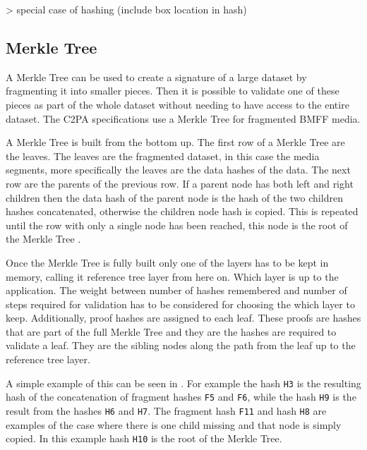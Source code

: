 
> special case of hashing (include box location in hash)



\subsection{Merkle Tree\label{sec:merkle}}

A Merkle Tree can be used to create a signature of a large dataset by fragmenting it into smaller pieces. Then it is possible to validate one of these pieces as part of the whole dataset without needing to have access to the entire dataset. The C2PA specifications use a Merkle Tree for fragmented BMFF media.

A Merkle Tree is built from the bottom up. The first row of a Merkle Tree are the leaves. The leaves are the fragmented dataset, in this case the media segments, more specifically the leaves are the data hashes of the data. The next row are the parents of the previous row. If a parent node has both left and right children then the data hash of the parent node is the hash of the two children hashes concatenated, otherwise the children node hash is copied. This is repeated until the row with only a single node has been reached, this node is the root of the Merkle Tree \cite{merkle}.

Once the Merkle Tree is fully built only one of the layers has to be kept in memory, calling it reference tree layer from here on. Which layer is up to the application. The weight between number of hashes remembered and number of steps required for validation has to be considered for choosing the which layer to keep. Additionally, proof hashes are assigned to each leaf. These proofs are hashes that are part of the full Merkle Tree and they are the hashes are required to validate a leaf. They are the sibling nodes along the path from the leaf up to the reference tree layer.

A simple example of this can be seen in . For example the hash \texttt{H3} is the resulting hash of the concatenation of fragment hashes \texttt{F5} and \texttt{F6}, while the hash \texttt{H9} is the result from the hashes \texttt{H6} and \texttt{H7}. The fragment hash \texttt{F11} and hash \texttt{H8} are examples of the case where there is one child missing and that node is simply copied. In this example hash \texttt{H10} is the root of the Merkle Tree.

